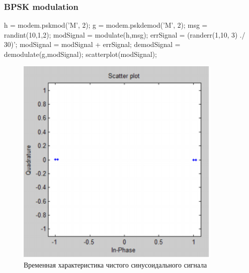 \documentclass[10pt,a4paper]{article}
\begin{document}
\subsubsection{BPSK modulation}
h = modem.pskmod('M', 2);\newline 
g = modem.pskdemod('M', 2); \newline
msg = randint(10,1,2); \newline
modSignal = modulate(h,msg); \newline
errSignal = (randerr(1,10, 3) ./ 30)';\newline 
modSignal = modSignal + errSignal; \newline
demodSignal = demodulate(g,modSignal); \newline
scatterplot(modSignal);\newline
\begin{figure}[h]
\centering
\includegraphics[width=10cm]{1_1.png} 
\caption{Временная характеристика чистого синусоидального сигнала} 
\end{figure}
\newpage
\FloatBarrier
\end{document}
